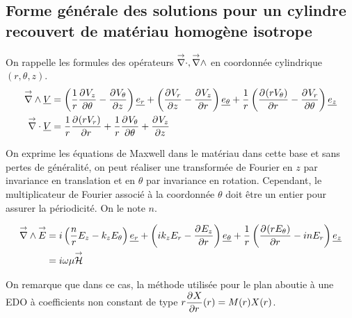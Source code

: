 


\subsection{Forme générale des solutions pour un cylindre recouvert de matériau homogène isotrope}

On rappelle les formules des opérateurs $\vdiv, \vrot$ en coordonnée cylindrique $(r,\theta,z)$.
\begin{align}
    \vrot \v{V} &= \left(\frac{1}{r}\ddr{\theta}{V_z} - \ddr{z}{V_\theta}\right)\v{e_r} + 
    \left(\ddr{z}{V_r} - \ddr{r}{V_z}\right)\v{e_\theta} +
    \frac{1}{r}\left(\ddr{r}{(rV_\theta)}-\ddr{\theta}{V_r}\right)\v{e_z} 
    \\
    \vdiv \v{V} &= \frac{1}{r}\ddr{r}{(rV_r)}+\frac{1}{r}\ddr{\theta}{V_\theta}+\ddr{z}{V_z}
\end{align}

\newcommand{\mr}{r}
\newcommand{\mt}{\theta}
\newcommand{\mz}{z}

\begin{figure}[!hbt]
    \centering
    \begin{tikzpicture}
        
    \end{tikzpicture}
\end{figure}

On exprime les équations de Maxwell dans le matériau dans cette base et sans pertes de généralité, on peut réaliser une transformée de Fourier en $z$ par invariance en translation et en $\theta$ par invariance en rotation. Cependant, le multiplicateur de Fourier associé à la coordonnée $\theta$ doit être un entier pour assurer la périodicité. On le note $n$.

\begin{align}
    \vrot \vE &= i\left(\frac{n}{r}E_z - k_zE_\theta\right)\v{e_r} + 
    \left(ik_zE_r - \ddr{r}{E_z}\right)\v{e_\theta} +
    \frac{1}{r}\left(\ddr{r}{(rE_\theta)}-inE_r\right)\v{e_z}
    \\
    &=i\w\mu \vH
\end{align}

On remarque que dans ce cas, la méthode utilisée pour le plan aboutie à une EDO à coefficients non constant de type $r\ddr{r}{X}(r) = M(r)X(r)$.



